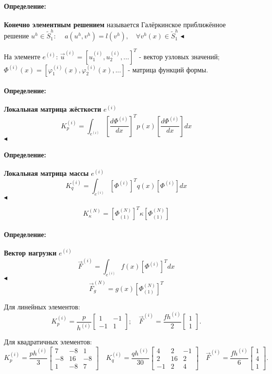 \documentclass{article}
\newenvironment{definition}{ \paragraph{Определение:}}{\hfill $\blacktriangleleft$}
\begin{document}
\begin{definition}
	\textbf{Конечно элементным решением} называется Галёркинское приближённое решение $u^h \in \tilde{S}_1^h $: $\quad a(u^h, v^h) = l(v^h), \quad \forall v^h(x) \in \tilde{S}_1^h $
\end{definition}

\bigskip

На элементе $e^{(i)}$:
$\overrightarrow{u}^{(i)} = [ u_1^{(i)}, u_2^{(i)}, ...]^T$ - вектор узловых значений;
$\Phi^{(i)}(x) = [\varphi_1^{(i)}(x), \varphi_2^{(i)}(x), ...]$ - матрица функций формы.

\begin{definition}
	\textbf{Локальная матрица жёсткости} $e^{(i)}$
	\[
		K_p^{(i)} = \int_{e^{(i)}} \left[ \dfrac{d \Phi^{(i)}}{dx} \right]^T p(x) \left[ \dfrac{d \Phi^{(i)}}{dx} \right] dx
	\]
\end{definition}

\begin{definition}
	\textbf{Локальная матрица массы} $e^{(i)}$
	\[
		K_q^{(i)} = \int_{e^{(i)}} \left[ \Phi^{(i)} \right]^T q(x) \left[ \Phi^{(i)} \right] dx
	\]
\end{definition}

\[
	K_{\kappa}^{(N)} = \left[ \Phi_{(1)}^{(N)} \right]^T \kappa \left[ \Phi_{(1)}^{(N)} \right]
\]

\begin{definition}
	\textbf{Вектор нагрузки} $e^{(i)}$
	\[
		\overrightarrow{F}^{(i)} = \int_{e^{(i)}} f(x) \left[ \Phi^{(i)} \right]^T dx
	\]
\end{definition}
\[
	\overrightarrow{F}_{g}^{(N)} = g(x) \left[ \Phi_{(1)}^{(N)} \right]^T
\]

Для линейных элементов:
\[
K_p^{(i)} = \dfrac{p}{h^{(i)}}
\begin{bmatrix}
1 & -1\\
-1&  1
\end{bmatrix};
\quad
\overrightarrow{F}^{(i)}  = \dfrac{f h^{(i)} }{2} 
\begin{bmatrix}
1\\
1
\end{bmatrix}.
\]

Для квадратичных элементов:
\[
K_p^{(i)} = \dfrac{p h^{(i)}}{3}
\begin{bmatrix}
7 & -8 & 1\\
-8 & 16 & -8\\
1 & -8 & 7
\end{bmatrix}
\quad
K_q^{(i)} = \dfrac{q h^{(i)}}{30}
\begin{bmatrix}
4 & 2 & -1\\
2 & 16 & 2\\
-1 & 2 & 4
\end{bmatrix}
\quad
\overrightarrow{F}^{(i)}  = \dfrac{f h^{(i)} }{6} 
\begin{bmatrix}
1\\
4\\
1
\end{bmatrix}.
\]
\end{document}
